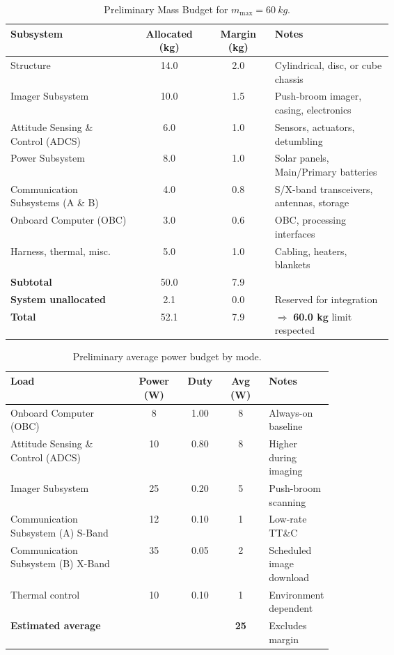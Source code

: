 ﻿\documentclass[12pt,a4paper]{report}
\begin{document}
\begin{table}[H]
\centering
\caption{Preliminary Mass Budget for $m_\mathrm{max}=\SI{60}{kg}$.}
\label{tab:mass}
\footnotesize
\begin{tabular*}{\linewidth}{@{\extracolsep{\fill}}L{0.33\linewidth} S[table-format=2.1] S[table-format=2.1] L{0.31\linewidth}@{}}
\toprule
\textbf{Subsystem} & {\textbf{Allocated (kg)}} & {\textbf{Margin (kg)}} & \textbf{Notes}\\
\midrule
Structure & 14.0 & 2.0 & Cylindrical, disc, or cube chassis\\
Imager Subsystem & 10.0 & 1.5 & Push-broom imager, casing, electronics\\
Attitude Sensing \& Control (ADCS) & 6.0 & 1.0 & Sensors, actuators, detumbling\\
Power Subsystem & 8.0 & 1.0 & Solar panels, Main/Primary batteries\\
Communication Subsystems (A \& B) & 4.0 & 0.8 & S/X-band transceivers, antennas, storage\\
Onboard Computer (OBC) & 3.0 & 0.6 & OBC, processing interfaces\\
Harness, thermal, misc. & 5.0 & 1.0 & Cabling, heaters, blankets\\
\midrule
\textbf{Subtotal} & 50.0 & 7.9 & \\
\textbf{System unallocated} & 2.1 & 0.0 & Reserved for integration\\
\midrule
\textbf{Total} & 52.1 & 7.9 & $\Rightarrow$ \textbf{60.0 kg} limit respected\\
\bottomrule
\end{tabular*}
\end{table}

\begin{table}[H]
\centering
\caption{Preliminary average power budget by mode.}
\label{tab:power}
\begin{tabular}{@{}L{0.37\linewidth}S[table-format=2.0]S[table-format=1.2]S[table-format=2.0]L{0.17\linewidth}@{}}
\toprule
\textbf{Load} & {\textbf{Power (W)}} & {\textbf{Duty}} & {\textbf{Avg (W)}} & \textbf{Notes}\\
\midrule
Onboard Computer (OBC) & 8  & 1.00 & 8  & Always-on baseline\\
Attitude Sensing \& Control (ADCS) & 10 & 0.80 & 8  & Higher during imaging\\
Imager Subsystem & 25 & 0.20 & 5  & Push-broom scanning\\
Communication Subsystem (A) S-Band & 12 & 0.10 & 1  & Low-rate TT\&C\\
Communication Subsystem (B) X-Band & 35 & 0.05 & 2  & Scheduled image download\\
Thermal control & 10 & 0.10 & 1  & Environment dependent\\
\midrule
\textbf{Estimated average} & {} & {} & \textbf{25} & Excludes margin\\
\bottomrule
\end{tabular}
\end{table}
\end{document}
